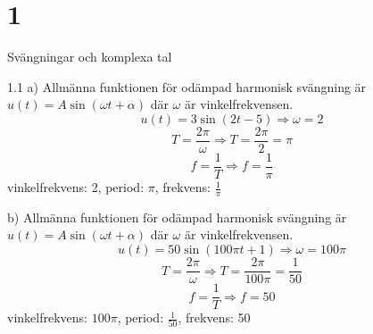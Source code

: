\chapter{1}{Svängningar och komplexa tal}
\begin{task}{1.1 a)}
Allmänna funktionen för odämpad harmonisk svängning är $u(t)=A\sin(\omega t + \alpha)$ där $\omega$ är vinkelfrekvensen.
\[u(t)=3\sin(2t-5) \Rightarrow \omega=2\]
\[T=\frac{2\pi}{\omega} \Rightarrow T = \frac{2\pi}{2} = \pi\]
\[f=\frac{1}{T} \Rightarrow f = \frac{1}{\pi}\]
\ans vinkelfrekvens: 2, period: $\pi$, frekvens: $\frac{1}{\pi}$
\end{task}

\begin{task}{b)}
	Allmänna funktionen för odämpad harmonisk svängning är $u(t)=A\sin(\omega t + \alpha)$ där $\omega$ är vinkelfrekvensen.
	\[u(t)=50\sin(100\pi t+1) \Rightarrow \omega=100\pi\]
	\[T=\frac{2\pi}{\omega} \Rightarrow T = \frac{2\pi}{100\pi} = \frac{1}{50}\]
	\[f=\frac{1}{T} \Rightarrow f = 50\]
	\ans vinkelfrekvens: $100\pi$, period: $\frac{1}{50}$, frekvens: 50
\end{task}